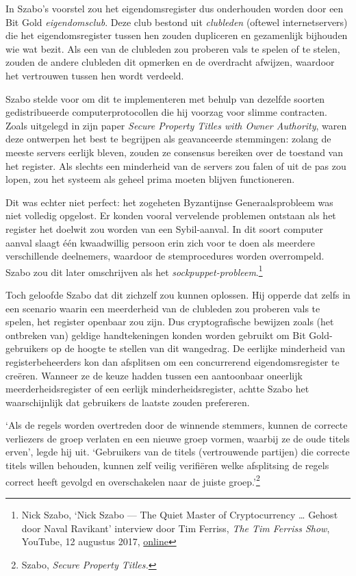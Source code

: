 \documentclass[
  a5paper,
  smalldemyvopaper,11pt,twoside,onecolumn,openright,extrafontsizes,
hidelinks]{memoir}
\begin{document}
In Szabo's voorstel zou het eigendomsregister dus onderhouden worden
door een Bit Gold \emph{eigendomsclub}. Deze club bestond uit
\emph{clubleden} (oftewel internetservers) die het eigendomsregister
tussen hen zouden dupliceren en gezamenlijk bijhouden wie wat bezit. Als
een van de clubleden zou proberen vals te spelen of te stelen, zouden de
andere clubleden dit opmerken en de overdracht afwijzen, waardoor het
vertrouwen tussen hen wordt verdeeld.

Szabo stelde voor om dit te implementeren met behulp van dezelfde
soorten gedistribueerde computerprotocollen die hij voorzag voor slimme
contracten. Zoals uitgelegd in zijn paper \emph{Secure Property Titles
with Owner Authority}, waren deze ontwerpen het best te begrijpen als
geavanceerde stemmingen: zolang de meeste servers eerlijk bleven, zouden
ze consensus bereiken over de toestand van het register. Als slechts een
minderheid van de servers zou falen of uit de pas zou lopen, zou het
systeem als geheel prima moeten blijven functioneren.

Dit was echter niet perfect: het zogeheten Byzantijnse Generaalsprobleem
was niet volledig opgelost. Er konden vooral vervelende problemen
ontstaan als het register het doelwit zou worden van een Sybil-aanval.
In dit soort computer aanval slaagt één kwaadwillig persoon erin zich
voor te doen als meerdere verschillende deelnemers, waardoor de
stemprocedures worden overrompeld. Szabo zou dit later omschrijven als
het \emph{sockpuppet-probleem}.\footnote{Nick Szabo, `Nick Szabo --- The
  Quiet Master of Cryptocurrency \ldots{} Gehost door Naval Ravikant'
  interview door Tim Ferriss, \emph{The Tim Ferriss Show}, YouTube, 12
  augustus 2017,
  \href{https://www.youtube.com/watch?v=3FA3UjA0igY}{online}}

Toch geloofde Szabo dat dit zichzelf zou kunnen oplossen. Hij opperde
dat zelfs in een scenario waarin een meerderheid van de clubleden zou
proberen vals te spelen, het register openbaar zou zijn. Dus
cryptografische bewijzen zoals (het ontbreken van) geldige
handtekeningen konden worden gebruikt om Bit Gold-gebruikers op de
hoogte te stellen van dit wangedrag. De eerlijke minderheid van
registerbeheerders kon dan afsplitsen om een concurrerend
eigendomsregister te creëren. Wanneer ze de keuze hadden tussen een
aantoonbaar oneerlijk meerderheidsregister of een eerlijk
minderheidsregister, achtte Szabo het waarschijnlijk dat gebruikers de
laatste zouden prefereren.

`Als de regels worden overtreden door de winnende stemmers, kunnen de
correcte verliezers de groep verlaten en een nieuwe groep vormen,
waarbij ze de oude titels erven', legde hij uit. `Gebruikers van de
titels (vertrouwende partijen) die correcte titels willen behouden,
kunnen zelf veilig verifiëren welke afsplitsing de regels correct heeft
gevolgd en overschakelen naar de juiste groep.'\footnote{Szabo,
  \emph{Secure Property Titles.}}
\end{document}
